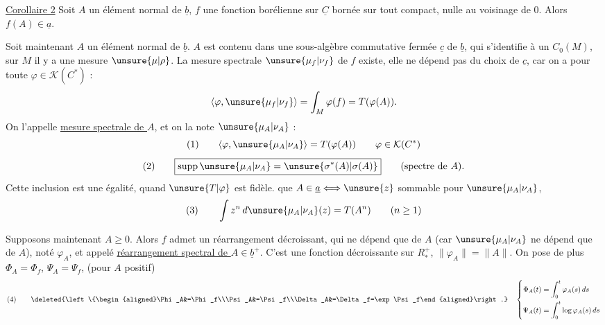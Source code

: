 \uline{Corollaire 2} Soit $A$ un élément normal de $\underline b$, $f$ une fonction borélienne sur $\underline C$ bornée sur tout compact, nulle au voisinage de $0$. Alors $f(A)\in\underline a$.

Soit maintenant $A$ un élément normal de $\underline b$. $A$ est contenu dans une sous-algèbre  commutative  fermée $\underline c$ de $\underline b$, qui s'identifie à un $C_0(M)$, sur $M$ il y a une mesure $\unsure{\mu|\rho}$.  La mesure spectrale $\unsure{\mu_f|\nu_f}$ de $f$ existe, elle ne dépend pas du choix de $\underline c$, car on a pour toute $\varphi\in\mathcal K(C^*)$ :
\[
\langle\varphi,\unsure{\mu_f|\nu_f}\rangle=\int_M\varphi(f)=T(\varphi(A)).
\]
On l'appelle \uline{mesure spectrale de $A$}, et on la note $\unsure{\mu_A|\nu_A}$ :
\[
(1)\qquad\langle\varphi,\unsure{\mu_A|\nu_A}\rangle=T(\varphi(A))\qquad\varphi\in\mathcal K(C^*)
\]
\[
(2)\qquad\boxed{\mathop{\rm supp}\unsure{\mu_A|\nu_A}=\unsure{\sigma^*(A)|\sigma(A)}}\qquad\text{(spectre de $A$).}
\]
Cette inclusion est une égalité, quand $\unsure{T|\varphi}$ est fidèle.  que $A\in\underline a\Longleftrightarrow\unsure{z}$ sommable pour $\unsure{\mu_A|\nu_A}$, 
\[
(3)\qquad\int z^n\,d\unsure{\mu_A|\nu_A}(z)=T(A^n)\qquad(n\geq1)
\]

Supposons maintenant $A\geq0$. Alors  $f$ admet un réarrangement décroissant, qui ne dépend que de $A$ (car $\unsure{\mu_A|\nu_A}$ ne dépend que de $A$), noté $\varphi_A$, et appelé \uline{réarrangement spectral de $A\in\underline b^+$}. C'est une fonction  décroissante sur $R^+_*$, $\|\varphi_A\|=\|A\|$. On pose de plus $\Phi_A=\Phi_f$, $\Psi_A=\Psi_f$, (pour $A$ positif)
\[
(4)\qquad\deleted{\left\{\begin{aligned}\Phi_A&=\Phi_f\\\Psi_A&=\Psi_f\\\Delta_A&=\Delta_f=\exp\Psi_f\end{aligned}\right.}
\quad
\left\{\begin{aligned}\Phi_A(t)&=\int_0^t\varphi_A(s)\,ds\\\Psi_A(t)&=\int_0^t\log\varphi_A(s)\,ds\end{aligned}\right.
\]
